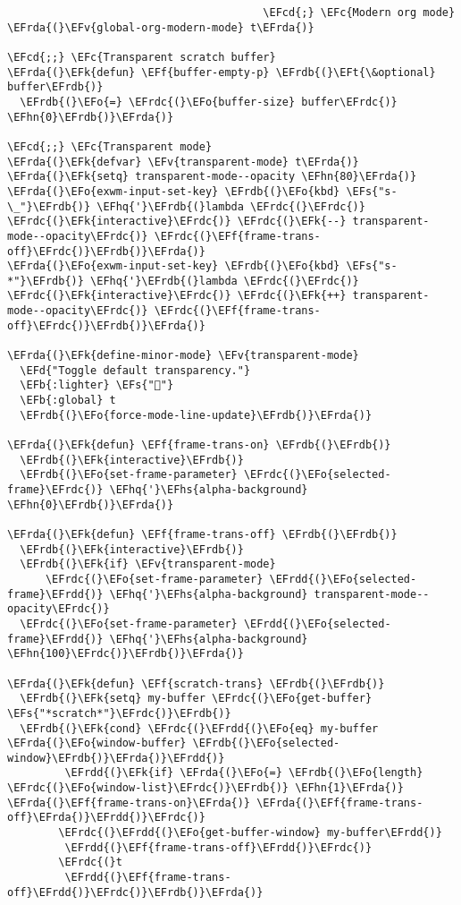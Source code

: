 \documentclass[a4wide,10pt]{article}
\newcommand{\EFc}[1]{\textcolor{EFc}{#1}} %
\newcommand{\EFcd}[1]{\textcolor{EFcd}{#1}} %
\newcommand{\EFs}[1]{\textcolor{EFs}{#1}} %
\newcommand{\EFd}[1]{\textcolor{EFd}{#1}} %
\newcommand{\EFk}[1]{\textcolor{EFk}{#1}} %
\newcommand{\EFb}[1]{\textcolor{EFb}{#1}} %
\newcommand{\EFf}[1]{\textcolor{EFf}{#1}} %
\newcommand{\EFv}[1]{\textcolor{EFv}{#1}} %
\newcommand{\EFt}[1]{\textcolor{EFt}{#1}} %
\newcommand{\EFo}[1]{\textcolor{EFo}{#1}} %
\newcommand{\EFhn}[1]{\textcolor{EFhn}{\textbf{#1}}} %
\newcommand{\EFhq}[1]{\textcolor{EFhq}{#1}} %
\newcommand{\EFhs}[1]{\textcolor{EFhs}{#1}} %
\newcommand{\EFrda}[1]{\textcolor{EFrda}{#1}} %
\newcommand{\EFrdb}[1]{\textcolor{EFrdb}{#1}} %
\newcommand{\EFrdc}[1]{\textcolor{EFrdc}{#1}} %
\newcommand{\EFrdd}[1]{\textcolor{EFrdd}{#1}} %
\begin{document}
\begin{Code}
\begin{Verbatim}
                                        \EFcd{;} \EFc{Modern org mode}
\EFrda{(}\EFv{global-org-modern-mode} t\EFrda{)}

\EFcd{;;} \EFc{Transparent scratch buffer}
\EFrda{(}\EFk{defun} \EFf{buffer-empty-p} \EFrdb{(}\EFt{\&optional} buffer\EFrdb{)}
  \EFrdb{(}\EFo{=} \EFrdc{(}\EFo{buffer-size} buffer\EFrdc{)} \EFhn{0}\EFrdb{)}\EFrda{)}

\EFcd{;;} \EFc{Transparent mode}
\EFrda{(}\EFk{defvar} \EFv{transparent-mode} t\EFrda{)}
\EFrda{(}\EFk{setq} transparent-mode--opacity \EFhn{80}\EFrda{)}
\EFrda{(}\EFo{exwm-input-set-key} \EFrdb{(}\EFo{kbd} \EFs{"s-\_"}\EFrdb{)} \EFhq{'}\EFrdb{(}lambda \EFrdc{(}\EFrdc{)} \EFrdc{(}\EFk{interactive}\EFrdc{)} \EFrdc{(}\EFk{--} transparent-mode--opacity\EFrdc{)} \EFrdc{(}\EFf{frame-trans-off}\EFrdc{)}\EFrdb{)}\EFrda{)}
\EFrda{(}\EFo{exwm-input-set-key} \EFrdb{(}\EFo{kbd} \EFs{"s-*"}\EFrdb{)} \EFhq{'}\EFrdb{(}lambda \EFrdc{(}\EFrdc{)} \EFrdc{(}\EFk{interactive}\EFrdc{)} \EFrdc{(}\EFk{++} transparent-mode--opacity\EFrdc{)} \EFrdc{(}\EFf{frame-trans-off}\EFrdc{)}\EFrdb{)}\EFrda{)}

\EFrda{(}\EFk{define-minor-mode} \EFv{transparent-mode}
  \EFd{"Toggle default transparency."}
  \EFb{:lighter} \EFs{""}
  \EFb{:global} t
  \EFrdb{(}\EFo{force-mode-line-update}\EFrdb{)}\EFrda{)}

\EFrda{(}\EFk{defun} \EFf{frame-trans-on} \EFrdb{(}\EFrdb{)}
  \EFrdb{(}\EFk{interactive}\EFrdb{)}
  \EFrdb{(}\EFo{set-frame-parameter} \EFrdc{(}\EFo{selected-frame}\EFrdc{)} \EFhq{'}\EFhs{alpha-background} \EFhn{0}\EFrdb{)}\EFrda{)}

\EFrda{(}\EFk{defun} \EFf{frame-trans-off} \EFrdb{(}\EFrdb{)}
  \EFrdb{(}\EFk{interactive}\EFrdb{)}
  \EFrdb{(}\EFk{if} \EFv{transparent-mode}
      \EFrdc{(}\EFo{set-frame-parameter} \EFrdd{(}\EFo{selected-frame}\EFrdd{)} \EFhq{'}\EFhs{alpha-background} transparent-mode--opacity\EFrdc{)}
  \EFrdc{(}\EFo{set-frame-parameter} \EFrdd{(}\EFo{selected-frame}\EFrdd{)} \EFhq{'}\EFhs{alpha-background} \EFhn{100}\EFrdc{)}\EFrdb{)}\EFrda{)}

\EFrda{(}\EFk{defun} \EFf{scratch-trans} \EFrdb{(}\EFrdb{)}
  \EFrdb{(}\EFk{setq} my-buffer \EFrdc{(}\EFo{get-buffer} \EFs{"*scratch*"}\EFrdc{)}\EFrdb{)}
  \EFrdb{(}\EFk{cond} \EFrdc{(}\EFrdd{(}\EFo{eq} my-buffer \EFrda{(}\EFo{window-buffer} \EFrdb{(}\EFo{selected-window}\EFrdb{)}\EFrda{)}\EFrdd{)}
         \EFrdd{(}\EFk{if} \EFrda{(}\EFo{=} \EFrdb{(}\EFo{length} \EFrdc{(}\EFo{window-list}\EFrdc{)}\EFrdb{)} \EFhn{1}\EFrda{)} \EFrda{(}\EFf{frame-trans-on}\EFrda{)} \EFrda{(}\EFf{frame-trans-off}\EFrda{)}\EFrdd{)}\EFrdc{)}
        \EFrdc{(}\EFrdd{(}\EFo{get-buffer-window} my-buffer\EFrdd{)}
         \EFrdd{(}\EFf{frame-trans-off}\EFrdd{)}\EFrdc{)}
        \EFrdc{(}t
         \EFrdd{(}\EFf{frame-trans-off}\EFrdd{)}\EFrdc{)}\EFrdb{)}\EFrda{)}


\end{Verbatim}
\end{Code}
\end{document}

